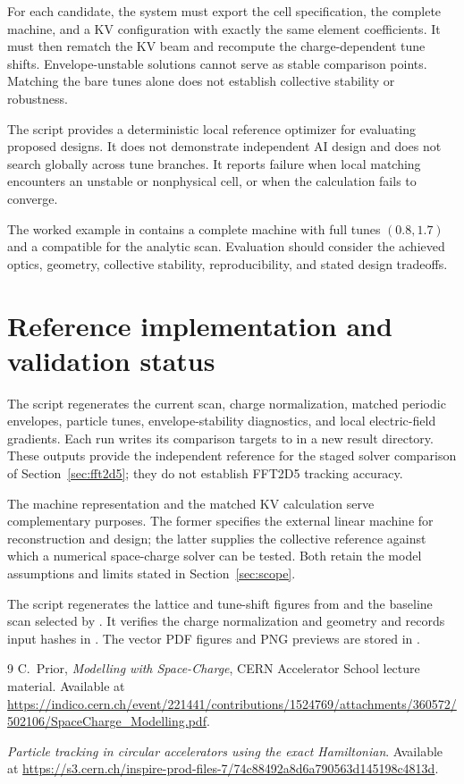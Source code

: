 \documentclass[11pt,a4paper]{article}
\numberwithin{equation}{section}
\begin{document}
For each candidate, the system must export the cell specification, the
complete machine, and a KV configuration with exactly the same element
coefficients. It must then rematch the KV beam and recompute the
charge-dependent tune shifts. Envelope-unstable solutions cannot serve
as stable comparison points. Matching the bare tunes alone does not
establish collective stability or robustness.

The script  provides a deterministic local
reference optimizer for evaluating proposed designs. It does not
demonstrate independent AI design and does not search globally across
tune branches. It reports failure when local matching encounters an
unstable or nonphysical cell, or when the calculation fails to converge.

The worked example in  contains a
complete machine with full tunes $(0.8,1.7)$ and a compatible
 for the analytic scan. Evaluation should consider
the achieved optics, geometry, collective stability, reproducibility,
and stated design tradeoffs.

\section{Reference implementation and validation status}
\label{sec:implementation}

The script  regenerates the
current scan, charge normalization, matched periodic envelopes, particle
tunes, envelope-stability diagnostics, and local electric-field
gradients. Each run writes its comparison targets to
 in a new result directory. These outputs
provide the independent reference for the staged solver comparison of
Section~\ref{sec:fft2d5}; they do not establish FFT2D5 tracking accuracy.

The machine representation and the matched KV calculation serve
complementary purposes. The former specifies the external linear
machine for reconstruction and design; the latter supplies the
collective reference against which a numerical space-charge solver can
be tested. Both retain the model assumptions and limits stated in
Section~\ref{sec:scope}.

The script  regenerates the lattice and
tune-shift figures from  and the baseline scan
selected by . It verifies the charge
normalization and geometry and records input hashes in
. The vector PDF figures and PNG
previews are stored in .

\begin{thebibliography}{9}
C.~Prior, \emph{Modelling with Space-Charge}, CERN Accelerator School
lecture material. Available at
\url{https://indico.cern.ch/event/221441/contributions/1524769/attachments/360572/502106/SpaceCharge_Modelling.pdf}.

\emph{Particle tracking in circular accelerators using the exact
Hamiltonian}. Available at
\url{https://s3.cern.ch/inspire-prod-files-7/74c88492a8d6a790563d145198c4813d}.
\end{thebibliography}
\end{document}
